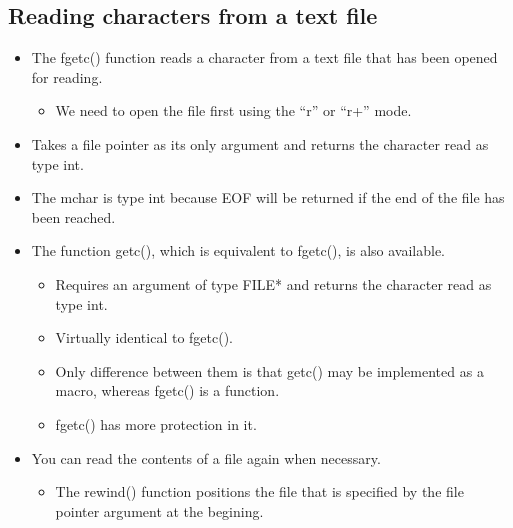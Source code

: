 \subsection{Reading characters from a text file}
\begin{itemize}
    \item The fgetc() function reads a character from a text file that has been opened for reading.
        \begin{itemize}
            \item We need to open the file first using the ``r'' or ``r+'' mode.
        \end{itemize}

    \item Takes a file pointer as its only argument and returns the character read as type int.
    
    \item The mchar is type int because EOF will be returned if the end of the file has been reached.
    \item The function getc(), which is equivalent to fgetc(), is also available.
        \begin{itemize}
            \item Requires an argument of type FILE* and returns the character read as type int.
            \item Virtually identical to fgetc().
            \item Only difference between them is that getc() may be implemented as a macro, whereas fgetc() is a function.
            \item fgetc() has more protection in it. 
        \end{itemize}
    
    \item You can read the contents of a file again when necessary.
        \begin{itemize}
            \item The rewind() function positions the file that is specified by the file pointer argument at the begining.
        \end{itemize}
    
\end{itemize}

